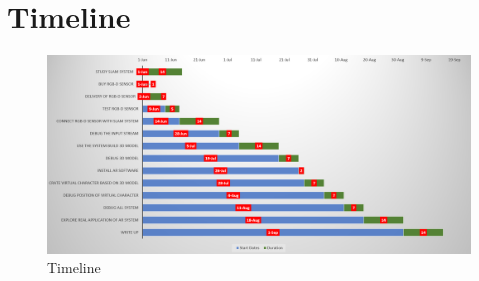 \documentclass[a4paper,11pt]{article}
\begin{document}
\newpage
\section{Timeline}
\begin{figure}[!htp]
\centering
\includegraphics[height=1.1\linewidth,width=1.5\linewidth,angle=-90]{20.png}
\caption{\label{fig:frog}Timeline}
\end{figure}



\end{document}
